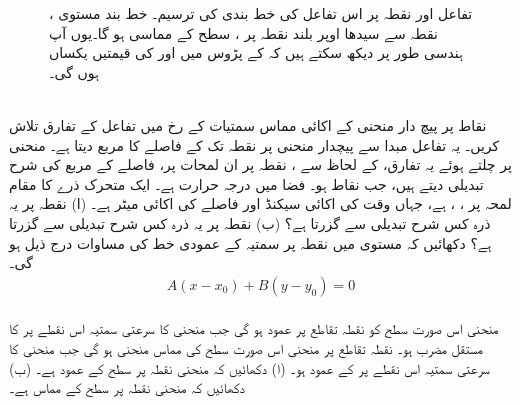 \begin{figure}
\begin{minipage}{0.45\textwidth}
\caption
{تفاعل  اور نقطہ  پر  اس تفاعل  کی خط بندی  کی ترسیم۔  خط بند مستوی ،  نقطہ  سے  سیدھا اوپر بلند نقطہ  پر ، سطح  کے مماسی ہو گا۔یوں آپ ہندسی  طور پر دیکھ سکتے ہیں کہ  کے  پڑوس میں  اور  کی قیمتیں یکساں ہوں گی۔}
\label{شکل_سوال_کثیرالمتغیر_خط_بندی-تفاعل}
\end{minipage}
\end{figure}
\\
نقاط   پر پیچ دار  منحنی   کے اکائی مماس سمتیات کے رخ میں      تفاعل  کے تفارق   تلاش کریں۔ یہ تفاعل مبدا سے پیچدار منحنی پر  نقطہ   تک کے  فاصلے کا مربع  دیتا ہے۔ منحنی پر چلتے ہوئے    یہ تفارق،     کے لحاظ سے ،  نقطہ    پر  ان لمحات پر، فاصلے کے مربع کی شرح تبدیلی دیتے ہیں، جب نقاط   ہو۔
فضا میں درجہ حرارت  ہے۔ ایک  متحرک ذرے کا مقام لمحہ  پر  ،   ،    ہے، جہاں وقت کی اکائی سیکنڈ اور فاصلے  کی اکائی میٹر ہے۔ (ا)  نقطہ  پر یہ ذرہ کس شرح تبدیلی  سے گزرتا ہے؟  (ب)  نقطہ  پر یہ ذرہ کس شرح تبدیلی  سے گزرتا ہے؟ 
دکھائیں کہ مستوی  میں  نقطہ    پر سمتیہ   کے عمودی خط کی مساوات درج ذیل ہو گی۔
\begin{align*}
A(x-x_0)+B(y-y_0)=0
\end{align*}
\\
 منحنی اس صورت سطح  کو نقطہ تقاطع پر عمود  ہو گی جب منحنی کا  سرعتی سمتیہ  اس نقطے  پر  کا مستقل مضرب ہو۔ نقطہ تقاطع پر  منحنی اس صورت  سطح  کی مماس منحنی ہو گی جب  منحنی کا سرعتی سمتیہ اس نقطے  پر  کے عمود ہو۔ (ا) دکھائیں کہ منحنی   نقطہ  پر سطح    کے عمود ہے۔ (ب) دکھائیں کہ منحنی  نقطہ  پر سطح   کے  مماس ہے۔

